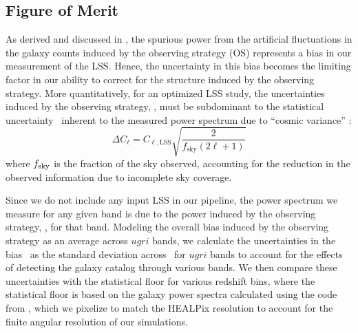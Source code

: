 \subsection{Figure of Merit}
\label{sec:\secname:FoM}
As derived and discussed in \citet{AwanEtal2016}, the spurious power from the artificial fluctuations in the galaxy counts induced by the observing strategy (OS) represents a bias in our measurement of the LSS. Hence, the uncertainty in this bias becomes the limiting factor in our ability to correct for the structure induced by the observing strategy. More quantitatively, for an optimized LSS study, the uncertainties induced by the observing strategy, \sigmaOS, must be subdominant to the statistical uncertainty \statFloor\ inherent to the measured power spectrum due to ``cosmic variance'' \citep{Dodelson}:
\begin{equation}
	\Delta C_\ell= C_{\ell,\mathrm{LSS}} \sqrt{\frac{2}{f_{\mathrm{sky}} (2\ell + 1)}}
	\label{eq: statFloor}
\end{equation}
where $f_{\rm{sky}}$ is the fraction of the sky observed, accounting for the reduction in the observed information due to incomplete sky coverage.

Since we do not include any input LSS in our pipeline, the power spectrum we measure for any given band is due to the power induced by the observing strategy, \CellOS, for that band. Modeling the overall bias induced by the observing strategy as an average across $ugri$ bands, we calculate the uncertainties in the bias \sigmaOS\ as the standard deviation across \CellOS\ for $ugri$ bands to account for the effects of detecting the galaxy catalog through various bands. We then compare these uncertainties with the statistical floor for various redshift bins, where the statistical floor is based on the galaxy power spectra calculated using the code from \citet{Zhan2006}, which we pixelize to match the HEALPix resolution to account for the finite angular resolution of our simulations.

